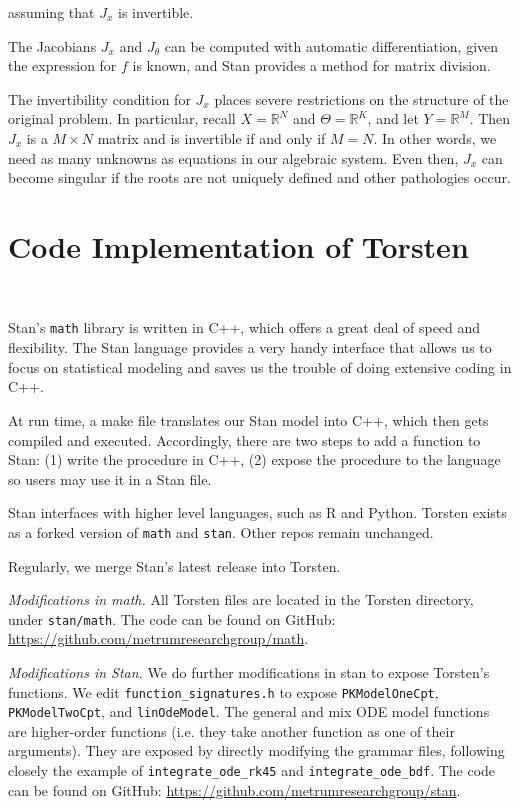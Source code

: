 \documentclass[11pt]{amsart}
\begin{document}
assuming that $J_x$ is invertible.

The Jacobians $J_x$ and $J_\theta$ can be computed with automatic differentiation,
given the expression for $f$ is known, and Stan provides a method for matrix division. 

The invertibility condition for $J_x$ places severe restrictions on the structure of the
original problem. In particular, recall $X = \mathbb{R}^N$ and $\Theta = \mathbb{R}^K$,
and let $Y = \mathbb{R}^M$. Then $J_x$ is a $M \times N$ matrix and is invertible
if and only if $M = N$. In other words, we need as many unknowns as equations in our
algebraic system. Even then, $J_x$ can become singular if the roots are not uniquely
defined and other pathologies occur.

\clearpage

\section{Code Implementation of Torsten} \

Stan's \texttt{math} library is written in C++, which offers a great deal of speed and 
flexibility. The Stan language provides a very handy interface that allows us to focus 
on statistical modeling and saves us the trouble of doing extensive coding in C++.

At run time, a make file translates our Stan model into C++, which then gets compiled 
and executed. Accordingly, there are two steps to add a function to Stan: (1) write the 
procedure in C++, (2) expose the procedure to the language so users may use it in a 
Stan file.

Stan interfaces with higher level languages, such as R and Python. Torsten exists as a forked 
version of \texttt{math} and \texttt{stan}. Other repos remain unchanged.

Regularly, we merge Stan's latest release into Torsten.

\textit{Modifications in math.} All Torsten files are located in 
the Torsten directory, under \texttt{stan/math}. The
code can be found on GitHub: \url{https://github.com/metrumresearchgroup/math}.

\textit{Modifications in Stan.} We do further modifications in stan to expose Torsten's 
functions. We edit \texttt{function\_signatures.h} to expose \texttt{PKModelOneCpt}, \texttt{PKModelTwoCpt}, 
and \texttt{linOdeModel}. The general and mix ODE model functions are higher-order functions (i.e. they 
take another function as one of their arguments). They are exposed by directly modifying 
the grammar files, following closely the example of \texttt{integrate\_ode\_rk45} and \texttt{integrate\_ode\_bdf}.
The code can be found on GitHub: \url{https://github.com/metrumresearchgroup/stan}.

\clearpage




\end{document}
